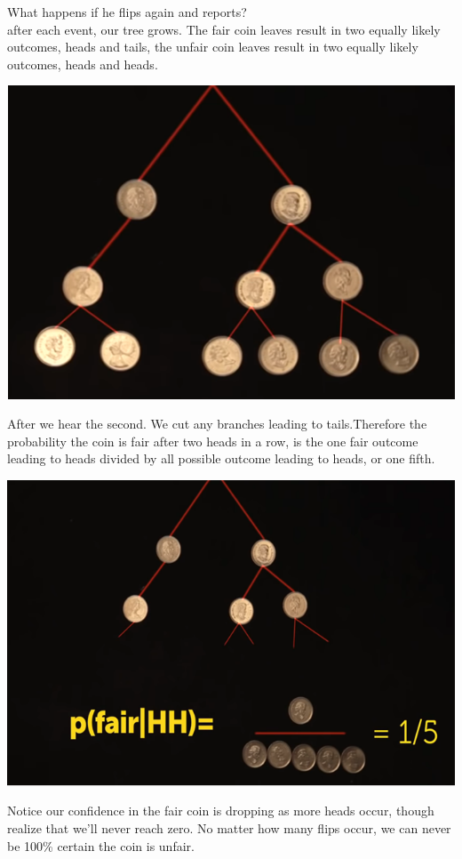 \documentclass{report}
\begin{document}
 What happens if he flips again and reports?\\
after each event, our tree grows. The fair coin leaves result in two equally likely outcomes, heads and tails, the unfair coin leaves result in two equally likely outcomes, heads and heads. 
 \begin{center}
	\includegraphics[scale=1]{76.png}
\end{center}
After we hear the second. We cut any branches leading to tails.Therefore the probability the coin is fair after two heads in a row, is the one fair outcome leading to heads divided by all possible outcome leading to heads, or one fifth. 
 \begin{center}
	\includegraphics[scale=1]{77.png}
\end{center}
Notice our confidence in the fair coin is dropping as more heads occur, though realize that we'll never reach zero. No matter how many flips occur, we can never be 100\% certain the coin is unfair. \\
\end{document}

